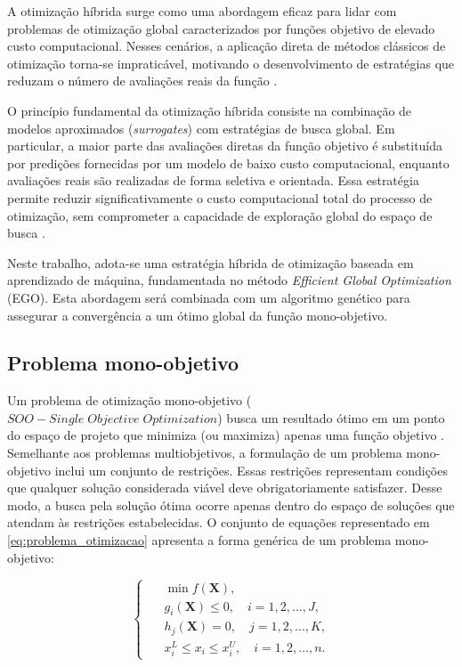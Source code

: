 A otimização híbrida surge como uma abordagem eficaz para lidar com problemas de otimização global caracterizados por funções objetivo de elevado custo computacional. Nesses cenários, a aplicação direta de métodos clássicos de otimização torna-se impraticável, motivando o desenvolvimento de estratégias que reduzam o número de avaliações reais da função \cite{Jones1998,Forrester2008}.

O princípio fundamental da otimização híbrida consiste na combinação de modelos aproximados (\textit{surrogates}) com estratégias de busca global. Em particular, a maior parte das avaliações diretas da função objetivo é substituída por predições fornecidas por um modelo de baixo custo computacional, enquanto avaliações reais são realizadas de forma seletiva e orientada. Essa estratégia permite reduzir significativamente o custo computacional total do processo de otimização, sem comprometer a capacidade de exploração global do espaço de busca \cite{Jones1998}.

Neste trabalho, adota-se uma estratégia híbrida de otimização baseada em aprendizado de máquina, fundamentada no método \textit{Efficient Global Optimization} (EGO). Esta abordagem será combinada com um algoritmo genético para assegurar a convergência a um ótimo global da função mono-objetivo.

\subsection{Problema mono-objetivo}

Um problema de otimização mono-objetivo ($SOO - Single \; Objective \;Optimization$) busca um resultado ótimo em um ponto do espaço de projeto que minimiza (ou maximiza) apenas uma função objetivo \cite{moreira}. Semelhante aos problemas multiobjetivos, a formulação de um problema mono-objetivo inclui um conjunto de restrições. Essas restrições representam condições que qualquer solução considerada viável deve obrigatoriamente satisfazer. Desse modo, a busca pela solução ótima ocorre apenas dentro do espaço de soluções que atendam às restrições estabelecidas. O conjunto de equações representado em \eqref{eq:problema_otimizacao} apresenta a forma genérica de um problema mono-objetivo:

\begin{equation}
\left\{\; \;
\begin{aligned}
& \min f(\textbf{X}), \\[0.3em]
& g_i(\textbf{X}) \le 0, \quad i = 1, 2, \dots, J, \\[0.3em]
& h_j(\textbf{X}) = 0, \quad j = 1, 2, \dots, K, \\[0.3em]
& x_i^L \le x_i \le x_i^U, \quad i = 1, 2, \dots, n.
\end{aligned}
\right.
\label{eq:problema_otimizacao}
\end{equation}
\vspace{1em}

